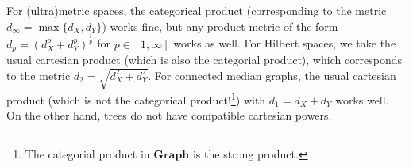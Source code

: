 \documentclass[a4paper]{article}
\theoremstyle{definition}
\DeclareMathOperator\Hom{Hom}
\begin{document}
%
%


For (ultra)metric spaces, the categorical product (corresponding to the metric $d_\infty=\max\{d_X,d_Y\}$) works fine, but any product metric of the form $d_p=(d_X^p+d_Y^p)^{\frac1p}$ for $p\in[1,\infty]$ works as well.
For Hilbert spaces, we take the usual cartesian product (which is also the categorial product), which corresponds to the metric $d_2=\sqrt{d_X^2+d_Y^2}$.
For connected median graphs, the usual cartesian product (which is not the categorical product!\footnote{The categorial product in $\mathbf{Graph}$ is the strong product.}) with $d_1=d_X+d_Y$ works well.
On the other hand, trees do not have compatible cartesian powers.


\end{document}
